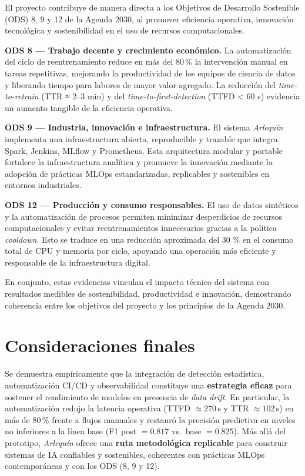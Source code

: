 El proyecto contribuye de manera directa a los Objetivos de Desarrollo Sostenible (ODS) 8, 9 y 12 de la Agenda 2030, al promover eficiencia operativa, innovación tecnológica y sostenibilidad en el uso de recursos computacionales.

\textbf{ODS 8 — Trabajo decente y crecimiento económico.}  
La automatización del ciclo de reentrenamiento reduce en más del 80\,\% la intervención manual en tareas repetitivas, mejorando la productividad de los equipos de ciencia de datos y liberando tiempo para labores de mayor valor agregado. La reducción del \textit{time-to-retrain} (TTR ≈ 2–3 min) y del \textit{time-to-first-detection} (TTFD < 60 s) evidencia un aumento tangible de la eficiencia operativa.

\textbf{ODS 9 — Industria, innovación e infraestructura.}  
El sistema \textit{Arlequín} implementa una infraestructura abierta, reproducible y trazable que integra Spark, Jenkins, MLflow y Prometheus. Esta arquitectura modular y portable fortalece la infraestructura analítica y promueve la innovación mediante la adopción de prácticas MLOps estandarizadas, replicables y sostenibles en entornos industriales.

\textbf{ODS 12 — Producción y consumo responsables.}  
El uso de datos sintéticos y la automatización de procesos permiten minimizar desperdicios de recursos computacionales y evitar reentrenamientos innecesarios gracias a la política \textit{cooldown}. Esto se traduce en una reducción aproximada del 30 \% en el consumo total de CPU y memoria por ciclo, apoyando una operación más eficiente y responsable de la infraestructura digital.

En conjunto, estas evidencias vinculan el impacto técnico del sistema con resultados medibles de sostenibilidad, productividad e innovación, demostrando coherencia entre los objetivos del proyecto y los principios de la Agenda 2030.


\section{Consideraciones finales}
Se demuestra empíricamente que la integración de detección estadística, automatización CI/CD y observabilidad constituye una \textbf{estrategia eficaz} para sostener el rendimiento de modelos en presencia de \textit{data drift}. 
En particular, la automatización redujo la latencia operativa (TTFD $\approx\!270$\,s y TTR $\approx\!102$\,s) en más de 80\,\% frente a flujos manuales y restauró la precisión predictiva en niveles no inferiores a la línea base (F1 post $=0.817$ vs.\ base $=0.825$). 
Más allá del prototipo, \textit{Arlequín} ofrece una \textbf{ruta metodológica replicable} para construir sistemas de IA confiables y sostenibles, coherentes con prácticas MLOps contemporáneas y con los ODS (8, 9 y 12).
